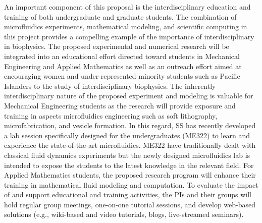 \documentclass[11pt]{article}
\begin{document}
An important component of this proposal is the interdisciplinary education and training of both undergraduate and graduate students. The combination of microfluidics experiments, mathematical modeling, and scientific computing in this project provides a compelling example of the importance of interdisciplinary in biophysics. The proposed experimental and numerical research will be integrated into an educational effort directed toward students in Mechanical Engineering and Applied Mathematics as well as an outreach effort aimed at encouraging women and under-represented minority students such as Pacific Islanders to the study of interdisciplinary biophysics. The inherently interdisciplinary nature of the proposed experiment and modeling is valuable for Mechanical Engineering students as the research will provide exposure and training in aspects microfluidics engineering such as soft lithography, microfabrication, and vesicle formation. In this regard, SS has recently developed a lab session specifically designed for the undergraduates (ME322) to learn and experience the state-of-the-art microfluidics. ME322 have traditionally dealt with classical fluid dynamics experiments but the newly designed microfluidics lab is intended to expose the students to the latest knowledge in the relevant field. 
For Applied Mathematics students, the proposed research program will enhance their training in mathematical fluid modeling and computation. To evaluate the impact of and support educational and training activities, the PIs and their groups will hold regular group meetings, one-on-one tutorial sessions, and develop web-based solutions (e.g., wiki-based and video tutorials, blogs, live-streamed seminars).
\end{document}
